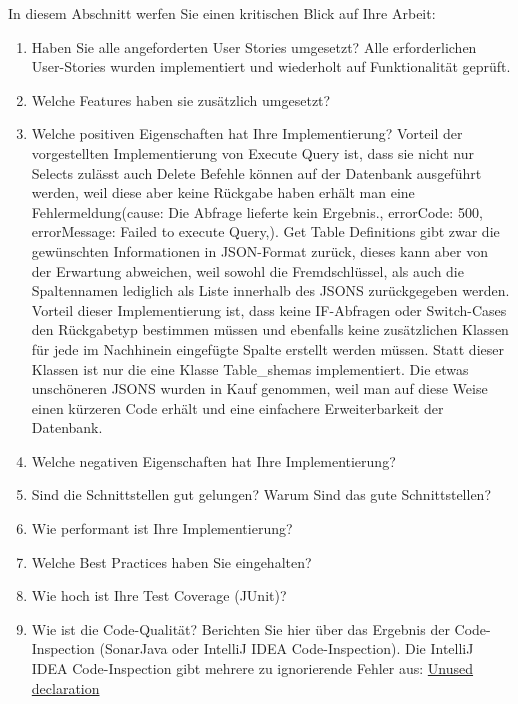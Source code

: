 \documentclass[fleqn,10pt,ngerman]{SelfArx}
\begin{document}
	In diesem Abschnitt werfen Sie einen kritischen Blick auf Ihre Arbeit:
	\begin{enumerate}
		\item Haben Sie alle angeforderten User Stories umgesetzt? 
		Alle erforderlichen User-Stories wurden implementiert und wiederholt auf Funktionalität geprüft. 
		
		\item Welche Features haben sie zus\"atzlich umgesetzt?
		\item Welche positiven Eigenschaften hat Ihre Implementierung?\newline
		Vorteil der vorgestellten Implementierung von Execute Query ist, dass sie nicht nur Selects zulässt auch Delete Befehle können auf der Datenbank ausgeführt werden, weil diese aber keine Rückgabe haben erhält man eine Fehlermeldung(cause: Die Abfrage lieferte kein Ergebnis.,
		errorCode: 500,
		errorMessage: Failed to execute Query,).\newline
		Get Table Definitions gibt zwar die gewünschten Informationen in  JSON-Format zurück, dieses kann aber von der Erwartung abweichen, weil sowohl die Fremdschlüssel, als auch die Spaltennamen lediglich als Liste innerhalb des JSONS zurückgegeben werden. Vorteil dieser Implementierung ist, dass keine IF-Abfragen oder Switch-Cases den Rückgabetyp bestimmen müssen und ebenfalls keine zusätzlichen Klassen für jede im Nachhinein eingefügte Spalte erstellt werden müssen. Statt dieser Klassen ist nur die eine Klasse Table\_shemas implementiert.
		Die etwas unschöneren JSONS wurden in Kauf genommen, weil man auf diese Weise einen kürzeren Code erhält und eine einfachere Erweiterbarkeit der Datenbank.
		
		\item Welche negativen Eigenschaften hat Ihre Implementierung? 		
		\item Sind die Schnittstellen gut gelungen? Warum Sind das gute Schnittstellen? 
		\item Wie performant ist Ihre Implementierung?
		\item Welche Best Practices haben Sie eingehalten? 
		\item Wie hoch ist Ihre Test Coverage (JUnit)? 
		\item Wie ist die Code-Qualität? Berichten Sie hier über das Ergebnis der Code-Inspection (SonarJava oder IntelliJ IDEA Code-Inspection). 
		Die  IntelliJ IDEA Code-Inspection gibt mehrere zu ignorierende  Fehler aus:\newline
		 \underline{Unused declaration}{
		 	
		 }
	\end{enumerate}
	
\end{document}
